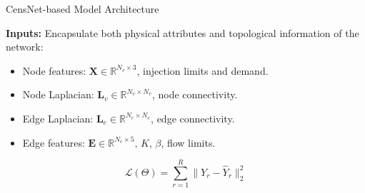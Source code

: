\documentclass[hyperref={colorlinks,citecolor=blue,linkcolor=blue,urlcolor=blue}]{beamer}
\begin{document}
\begin{frame}{CensNet-based Model Architecture}
\scriptsize
\justifying
    \centering
    \resizebox{0.9\textwidth}{!}{%
    } 

\vspace{0.2cm}
\textbf{Inputs:} Encapsulate both physical attributes and topological information of the network:
\begin{itemize}
    \item \footnotesize Node features: 
    \(\mathbf{X} \in \mathbb{R}^{N_v \times 3}\),  
    injection limits and demand. 
    
    \item \footnotesize Node Laplacian: 
    \(\mathbf{L}_v \in \mathbb{R}^{N_v \times N_v}\),  
    node connectivity. 
    
    \item \footnotesize Edge Laplacian: 
    \(\mathbf{L}_e \in \mathbb{R}^{N_e \times N_e}\),  
    edge connectivity. 
    
    \item \footnotesize Edge features: 
    \(\mathbf{E} \in \mathbb{R}^{N_e \times 5}\),  
    \(K\), \(\beta\), flow limits. 
\end{itemize}

\[
    \mathcal{L}(\Theta) = \sum_{r=1}^{R} \| Y_r - \hat{Y}_r \|^2_2 
\]

\end{frame}
\end{document}
